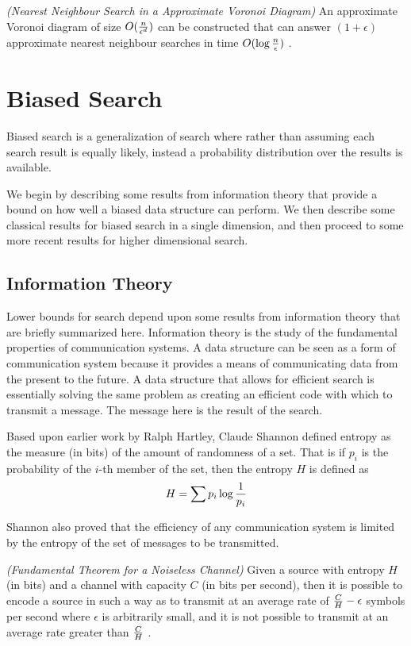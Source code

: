 \documentclass[mcs]{scsthesis}
\begin{document}
\begin{thm} \emph{(Nearest Neighbour Search in a Approximate Voronoi Diagram)} 
An approximate Voronoi diagram of size \(O({n \over \epsilon ^ d})\) can be
constructed that can answer \((1 + \epsilon)\) approximate nearest neighbour
searches in time \(O(\log {n \over \epsilon})\) \cite{arya-avd}.
\end{thm}

\section{Biased Search}

Biased search is a generalization of search where rather than assuming each
search result is equally likely, instead a probability distribution over the
results is available.

We begin by describing some results from information theory that provide a
bound on how well a biased data structure can perform. We then describe some
classical results for biased search in a single dimension, and then proceed
to some more recent results for higher dimensional search.

\subsection{Information Theory}

Lower bounds for search depend upon some results from information theory that
are briefly summarized here. Information theory is the study of the fundamental
properties of communication systems. A data structure can be seen as a form of
communication system because it provides a means of communicating data from the
present to the future. A data structure that allows for efficient search is
essentially solving the same problem as creating an efficient code with which
to transmit a message. The message here is the result of the search.

Based upon earlier work by Ralph Hartley, Claude Shannon \cite{claudeshannonwasagod}
defined entropy as the measure (in bits) of the amount of randomness of a set.
That is if \(p_i\) is the probability of the \(i\)-th member of the set, then the
entropy \(H\) is defined as
$$
H = \sum{ p_i \log{1 \over p_i}}
$$

Shannon also proved that the efficiency of any communication system is limited
by the entropy of the set of messages to be transmitted.

\begin{thm} \emph{(Fundamental Theorem for a Noiseless Channel)} 
Given a source with entropy \(H\) (in bits) and a channel with capacity \(C\)
(in bits per second), then it is possible to encode a source in such a way as to
transmit at an average rate of \({C \over H} - \epsilon\) symbols per second
where \(\epsilon\) is arbitrarily small, and it is not possible to transmit
at an average rate greater than \(C \over H\) \cite{claudeshannonwasagod}.
\end{thm}
\end{document}
